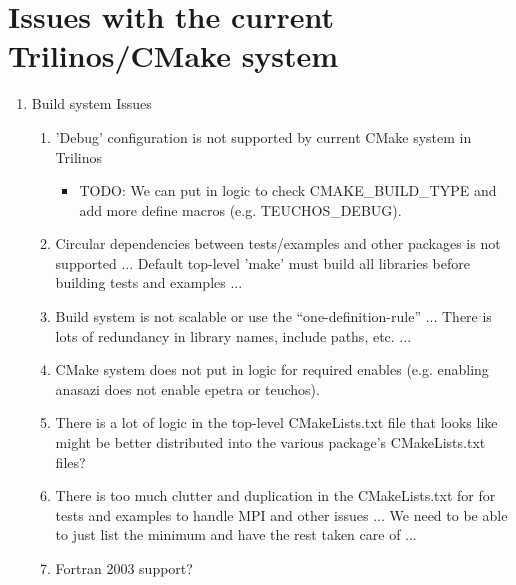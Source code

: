 \documentclass[pdf,ps2pdf,11pt]{SANDreport}
\begin{document}
%
\section{Issues with the current Trilinos/CMake system}
%

\begin{enumerate}

{}\item Build system Issues

  \begin{enumerate}

  {}\item 'Debug' configuration is not supported by current CMake
  system in Trilinos

    \begin{itemize}

    {}\item TODO: We can put in logic to check CMAKE\_BUILD\_TYPE and
    add more define macros (e.g. TEUCHOS\_DEBUG).

    \end{itemize}

  {}\item Circular dependencies between tests/examples and other
  packages is not supported ... Default top-level 'make' must build
  all libraries before building tests and examples ...

  {}\item Build system is not scalable or use the
  ``one-definition-rule'' ... There is lots of redundancy in library
  names, include paths, etc. ...

  {}\item CMake system does not put in logic for required enables
  (e.g. enabling anasazi does not enable epetra or teuchos).

  {}\item There is a lot of logic in the top-level CMakeLists.txt file
  that looks like might be better distributed into the various
  package's CMakeLists.txt files?

  {}\item There is too much clutter and duplication in the
  CMakeLists.txt for for tests and examples to handle MPI and other
  issues ... We need to be able to just list the minimum and have the
  rest taken care of ...

  {}\item Fortran 2003 support?

  \end{enumerate}


\end{enumerate}
\end{document}
